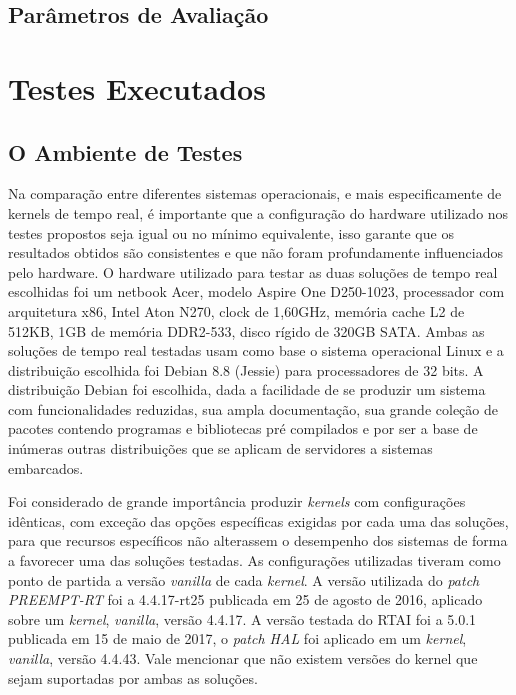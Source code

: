 \subsection{Parâmetros de Avaliação}

\section{Testes Executados}
\subsection{O Ambiente de Testes}
Na comparação entre diferentes sistemas operacionais, e mais especificamente de kernels de tempo real,  é importante que a configuração do hardware utilizado nos testes propostos seja igual ou no mínimo equivalente, isso garante que os resultados obtidos são consistentes e que não foram profundamente influenciados pelo hardware.
O hardware utilizado para testar as duas soluções de tempo real escolhidas foi um netbook Acer, modelo Aspire One D250-1023, processador com arquitetura x86, Intel Aton N270, clock de 1,60GHz, memória cache L2 de 512KB, 1GB de memória DDR2-533, disco rígido de 320GB SATA.
Ambas as soluções de tempo real testadas usam como base o sistema operacional Linux e a distribuição escolhida foi Debian 8.8 (Jessie) para processadores de 32 bits. A distribuição Debian foi escolhida, dada a facilidade de se produzir um sistema com funcionalidades reduzidas, sua ampla documentação, sua grande coleção de pacotes contendo programas e bibliotecas pré compilados e por ser a base de inúmeras outras distribuições que se aplicam de servidores a sistemas embarcados. 

Foi considerado de grande importância produzir \textit{kernels} com configurações idênticas, com exceção das opções específicas exigidas por cada uma das soluções, para que recursos específicos não alterassem o desempenho dos sistemas de forma a favorecer uma das soluções testadas. As configurações utilizadas tiveram como ponto de partida a versão \textit{vanilla} de cada \textit{kernel}. A versão utilizada do \textit{patch PREEMPT-RT} foi a 4.4.17-rt25 publicada em 25 de agosto de 2016, aplicado sobre um \textit{kernel}, \textit{vanilla}, versão 4.4.17. A versão testada do RTAI foi a 5.0.1 publicada em 15 de maio de 2017, o \textit{patch HAL} foi aplicado em um \textit{kernel}, \textit{vanilla}, versão 4.4.43. Vale mencionar que não existem versões do kernel que sejam suportadas por ambas as soluções.

